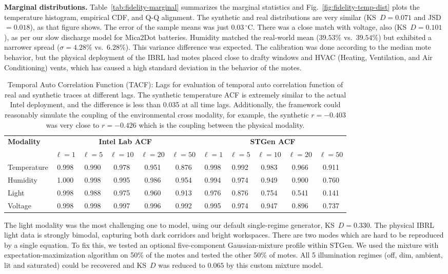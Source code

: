 \documentclass[jsan,article,submit,moreauthors,pdftex]{Definitions/mdpi}
\begin{document}
\textbf{Marginal distributions.}
Table~\ref{tab:fidelity-marginal} summarizes the marginal statistics and Fig.~\ref{fig:fidelity-temp-dist} plots the temperature histogram, empirical CDF, and Q-Q alignment. The synthetic and real distributions are very similar (KS~$D=0.071$ and JSD~$=0.018$), as that figure shows. The error of the sample means was just $0.03\,^\circ$C. There was a close match with voltage, also (KS~$D=0.101$), as per our slow discharge model for Mica2Dot batteries. Humidity matched the real-world mean ($39.53\%$ vs.\ $39.54\%$) but exhibited a narrower spread ($\sigma=4.28\%$ vs.\ $6.28\%$). This variance difference was  expected. The calibration was done according to the median mote behavior, but the physical deployment of the IBRL had motes placed close to drafty windows and HVAC (Heating, Ventilation, and Air Conditioning) vents, which has caused a high standard deviation in the behavior of the motes. 

\begin{table}[H]
\centering
\caption{Temporal Auto Correlation Function (TACF): Lags for evaluation of temporal auto correlation function of real and synthetic traces at different lags. The synthetic temperature ACF is extremely similar to the actual Intel deployment, and the difference is less than 0.035 at all time lags. Additionally, the framework could reasonably simulate the coupling of the environmental cross modality, for example, the synthetic $r = -0.403$ was very close to $r = -0.426$ which is the coupling between the physical modality.}
\label{tab:fidelity-acf}
\small
\begin{tabular}{l|ccccc|ccccc}
\hline
\textbf{Modality} & \multicolumn{5}{c|}{\textbf{Intel Lab ACF}} & \multicolumn{5}{c}{\textbf{STGen ACF}} \\
 & $\ell{=}1$ & $\ell{=}5$ & $\ell{=}10$ & $\ell{=}20$ & $\ell{=}50$ & $\ell{=}1$ & $\ell{=}5$ & $\ell{=}10$ & $\ell{=}20$ & $\ell{=}50$ \\
\hline
Temperature & 0.998 & 0.990 & 0.978 & 0.951 & 0.876 & 0.998 & 0.992 & 0.983 & 0.966 & 0.911 \\
Humidity    & 1.000 & 0.998 & 0.995 & 0.986 & 0.954 & 0.994 & 0.974 & 0.949 & 0.900 & 0.760 \\
Light       & 0.998 & 0.988 & 0.975 & 0.960 & 0.913 & 0.976 & 0.876 & 0.754 & 0.541 & 0.141 \\
Voltage     & 0.998 & 0.998 & 0.997 & 0.996 & 0.992 & 0.995 & 0.974 & 0.947 & 0.896 & 0.737 \\
\hline
\end{tabular}
\end{table}
The light modality was the most challenging one to model, using our default single-regime generator, KS~$D=0.330$. The physical IBRL light data is strongly bimodal, capturing both dark corridors and bright workspaces. There are two modes which are hard to be reproduced by a single equation. To fix this, we tested an optional five-component Gaussian-mixture profile within STGen. We used the mixture with expectation-maximization algorithm on 50\% of the motes and tested the other 50\% of motes. All 5 illumination regimes (off, dim, ambient, lit and saturated) could be recovered and KS~$D$ was reduced to $0.065$ by this custom mixture model. 
\end{document}
